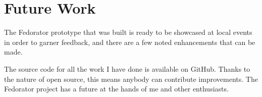         
    \section{Future Work}
        The Fedorator prototype that was built is ready to be showcased at local events in order to garner feedback, and there are a few noted enhancements that can be made.
        
        The source code for all the work I have done is available on GitHub.  Thanks to the nature of open source, this means anybody can contribute improvements.  The Fedorator project has a future at the hands of me and other enthusiasts.
        
        
